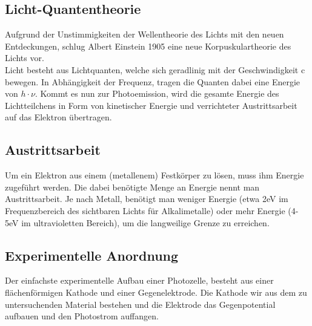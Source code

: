 \documentclass{article}
\begin{document}
\subsection{Licht-Quantentheorie}
Aufgrund der Unstimmigkeiten der Wellentheorie des Lichts mit den neuen Entdeckungen, schlug Albert Einstein 1905 eine neue Korpuskulartheorie des Lichts vor.\\
Licht besteht aus Lichtquanten, welche sich geradlinig mit der Geschwindigkeit c bewegen. In Abhängigkeit der Frequenz, tragen die Quanten dabei eine Energie von \(h\cdot \nu\). Kommt es nun zur Photoemission, wird die gesamte Energie des Lichtteilchens in Form von kinetischer Energie und verrichteter Austrittsarbeit auf das Elektron übertragen. 

\subsection{Austrittsarbeit}
Um ein Elektron aus einem (metallenem) Festkörper zu lösen, muss ihm Energie zugeführt werden. Die dabei benötigte Menge an Energie nennt man Austrittsarbeit. Je nach Metall, benötigt man weniger Energie (etwa 2eV im Frequenzbereich des sichtbaren Lichts für Alkalimetalle) oder mehr Energie (4-5eV im ultravioletten Bereich), um die langweilige Grenze zu erreichen. 

\subsection{Experimentelle Anordnung}
Der einfachste experimentelle Aufbau einer Photozelle, besteht aus einer flächenförmigen Kathode und einer Gegenelektrode. Die Kathode wir aus dem zu untersuchenden Material bestehen und die Elektrode das Gegenpotential aufbauen und den Photostrom auffangen.

\begin{center}
\begin{minipage}{\linewidth}
\centering
{}
%
\label{photozelle}
\end{minipage}
\end{center}
\end{document}
